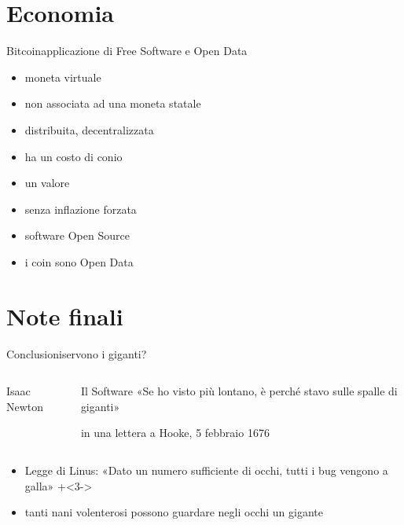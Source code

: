 \documentclass[italian,compress,red]{beamer}
\begin{document}
\section{Economia}

\begin{frame}[<+->]{ \hspace{0.3ex} Bitcoin}{applicazione di Free Software e Open Data}
 \begin{itemize}
  \item moneta virtuale 
  \item non associata ad una moneta statale
  \item distribuita, decentralizzata
  \item ha un costo di conio
  \item un valore
  \item senza inflazione forzata
  \item software Open Source
  \item i coin sono Open Data
 \end{itemize}

\end{frame}

\section{Note finali}

\begin{frame}{Conclusioni}{servono i giganti?}
  \begin{columns}[T]
  \begin{column}{.3\textwidth}
    \begin{block}{Isaac Newton}
      \begin{center}
      \end{center}
      \end{block}

  \end{column} 
  \begin{column}{.7\textwidth}
    \begin{exampleblock}{Il Software}
      «Se ho visto più lontano, è perché stavo sulle spalle di giganti»
      \vfill
      \begin{tiny} in una lettera a Hooke, 5 febbraio 1676\end{tiny}
      
    \end{exampleblock}   
  \end{column}
  \end{columns}
  
  \begin{itemize}
   \onslide+<2->
   \item Legge di Linus: «Dato un numero sufficiente di occhi, tutti i bug vengono a galla» 
   \onslide+<3->
   \item tanti nani volenterosi possono guardare negli occhi un gigante
  \end{itemize}


\end{frame}
\end{document}
